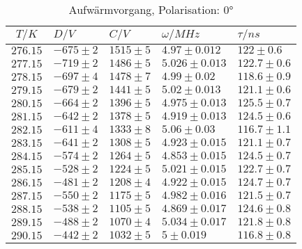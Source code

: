 \begin{table}[h!]
\scriptsize\centering
\begin{tabular}{|c|l|l|l|l|}
\hline
$T/K$&$D/V$&$C/V$&$\omega/MHz$&$\tau/ns$\\\hline\hline
$276.15$&$-675\pm2$&$1515\pm5$&$4.97\pm0.012$&$122\pm0.6$\\\hline
$277.15$&$-719\pm2$&$1486\pm5$&$5.026\pm0.013$&$122.7\pm0.6$\\\hline
$278.15$&$-697\pm4$&$1478\pm7$&$4.99\pm0.02$&$118.6\pm0.9$\\\hline
$279.15$&$-679\pm2$&$1441\pm5$&$5.02\pm0.013$&$121.1\pm0.6$\\\hline
$280.15$&$-664\pm2$&$1396\pm5$&$4.975\pm0.013$&$125.5\pm0.7$\\\hline
$281.15$&$-642\pm2$&$1378\pm5$&$4.919\pm0.013$&$124.5\pm0.6$\\\hline
$282.15$&$-611\pm4$&$1333\pm8$&$5.06\pm0.03$&$116.7\pm1.1$\\\hline
$283.15$&$-641\pm2$&$1308\pm5$&$4.923\pm0.015$&$121.1\pm0.7$\\\hline
$284.15$&$-574\pm2$&$1264\pm5$&$4.853\pm0.015$&$124.5\pm0.7$\\\hline
$285.15$&$-528\pm2$&$1224\pm5$&$5.021\pm0.015$&$122.7\pm0.7$\\\hline
$286.15$&$-481\pm2$&$1208\pm4$&$4.922\pm0.015$&$124.7\pm0.7$\\\hline
$287.15$&$-550\pm2$&$1175\pm5$&$4.982\pm0.016$&$121.5\pm0.7$\\\hline
$288.15$&$-538\pm2$&$1105\pm5$&$4.869\pm0.017$&$124.6\pm0.8$\\\hline
$289.15$&$-488\pm2$&$1070\pm4$&$5.034\pm0.017$&$121.8\pm0.8$\\\hline
$290.15$&$-442\pm2$&$1032\pm5$&$5\pm0.019$&$116.8\pm0.8$\\\hline
\end{tabular}
\caption{Aufwärmvorgang, Polarisation: 0°\label{warm0}}
\end{table}
